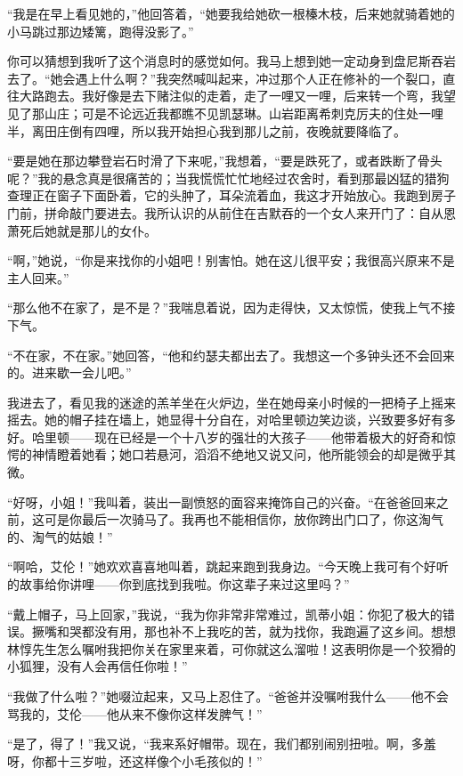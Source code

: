 \par “我是在早上看见她的，”他回答着，“她要我给她砍一根榛木枝，后来她就骑着她的小马跳过那边矮篱，跑得没影了。”
\par 你可以猜想到我听了这个消息时的感觉如何。我马上想到她一定动身到盘尼斯吞岩去了。“她会遇上什么啊？”我突然喊叫起来，冲过那个人正在修补的一个裂口，直往大路跑去。我好像是去下赌注似的走着，走了一哩又一哩，后来转一个弯，我望见了那山庄；可是不论远近我都瞧不见凯瑟琳。山岩距离希刺克厉夫的住处一哩半，离田庄倒有四哩，所以我开始担心我到那儿之前，夜晚就要降临了。
\par “要是她在那边攀登岩石时滑了下来呢，”我想着，“要是跌死了，或者跌断了骨头呢？”我的悬念真是很痛苦的；当我慌慌忙忙地经过农舍时，看到那最凶猛的猎狗查理正在窗子下面卧着，它的头肿了，耳朵流着血，我这才开始放心。我跑到房子门前，拼命敲门要进去。我所认识的从前住在吉默吞的一个女人来开门了：自从恩萧死后她就是那儿的女仆。
\par “啊，”她说，“你是来找你的小姐吧！别害怕。她在这儿很平安；我很高兴原来不是主人回来。”
\par “那么他不在家了，是不是？”我喘息着说，因为走得快，又太惊慌，使我上气不接下气。
\par “不在家，不在家。”她回答，“他和约瑟夫都出去了。我想这一个多钟头还不会回来的。进来歇一会儿吧。”
\par 我进去了，看见我的迷途的羔羊坐在火炉边，坐在她母亲小时候的一把椅子上摇来摇去。她的帽子挂在墙上，她显得十分自在，对哈里顿边笑边谈，兴致要多好有多好。哈里顿——现在已经是一个十八岁的强壮的大孩子——他带着极大的好奇和惊愕的神情瞪着她看；她口若悬河，滔滔不绝地又说又问，他所能领会的却是微乎其微。
\par “好呀，小姐！”我叫着，装出一副愤怒的面容来掩饰自己的兴奋。“在爸爸回来之前，这可是你最后一次骑马了。我再也不能相信你，放你跨出门口了，你这淘气的、淘气的姑娘！”
\par “啊哈，艾伦！”她欢欢喜喜地叫着，跳起来跑到我身边。“今天晚上我可有个好听的故事给你讲哩——你到底找到我啦。你这辈子来过这里吗？”
\par “戴上帽子，马上回家，”我说，“我为你非常非常难过，凯蒂小姐：你犯了极大的错误。撅嘴和哭都没有用，那也补不上我吃的苦，就为找你，我跑遍了这乡间。想想林惇先生怎么嘱咐我把你关在家里来着，可你就这么溜啦！这表明你是一个狡猾的小狐狸，没有人会再信任你啦！”
\par “我做了什么啦？”她啜泣起来，又马上忍住了。“爸爸并没嘱咐我什么——他不会骂我的，艾伦——他从来不像你这样发脾气！”
\par “是了，得了！”我又说，“我来系好帽带。现在，我们都别闹别扭啦。啊，多羞呀，你都十三岁啦，还这样像个小毛孩似的！”
